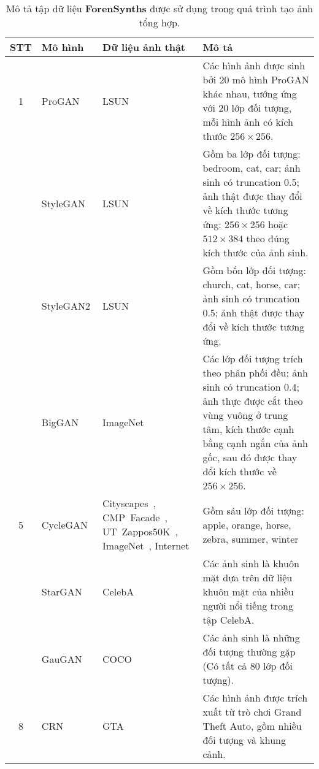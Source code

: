 \begin{table}[ht!]
	\centering
	\caption{Mô tả tập dữ liệu \textbf{ForenSynths} được sử dụng trong quá trình tạo ảnh tổng hợp.}
	\label{tab:forensynths-dataset}
	\begin{adjustbox}{max width=\textwidth}
		\renewcommand{\arraystretch}{1.5}
		\setlength{\tabcolsep}{10pt}
		\begin{tabular}{c p{2cm} p{3cm} p{8.5cm}}
			\toprule
			\textbf{STT} & \textbf{Mô hình} & \textbf{Dữ liệu ảnh thật} & \textbf{Mô tả} \\
			\midrule
			1 & ProGAN~\cite{karras2018progressive} & LSUN~\cite{Yu2015LSUNCO} & Các hình ảnh được sinh bởi 20 mô hình ProGAN khác nhau, tướng ứng với 20 lớp đối tượng, mỗi hình ảnh có kích thước  $256 \times 256$. \\
			\hdashline
			2 & StyleGAN~\cite{karras2019style} & LSUN~\cite{Yu2015LSUNCO} & Gồm ba lớp đối tượng: bedroom, cat, car; ảnh sinh có truncation 0.5; ảnh thật được thay đổi về kích thước tương ứng: $256 \times 256$ hoặc $512 \times 384$ theo đúng kích thước của ảnh sinh. \\
			\hdashline
			3 & StyleGAN2\cite{Karras2019AnalyzingAI} & LSUN~\cite{Yu2015LSUNCO} & Gồm bốn lớp đối tượng: church, cat, horse, car; ảnh sinh có truncation 0.5; ảnh thật được thay đổi về kích thước tương ứng. \\
			\hdashline
			4 & BigGAN~\cite{brock2018large} & ImageNet~\cite{5206848} & Các lớp đối tượng trích theo phân phối đều; ảnh sinh có truncation 0.4; ảnh thực được cắt theo vùng vuông ở trung tâm, kích thước cạnh bằng cạnh ngắn của ảnh gốc, sau đó được thay đổi kích thước về $256 \times 256$. \\
			\midrule
			5 & CycleGAN~\cite{zhu2017unpaired} & Cityscapes~\cite{Cordts2016Cityscapes}, CMP~Facade~\cite{Tylecek13}, UT~Zappos50K~\cite{6909426}, ImageNet~\cite{5206848}, Internet & Gồm sáu lớp đối tượng: apple, orange, horse, zebra, summer, winter\\
			\hdashline
			6 & StarGAN~\cite{choi2018stargan} & CelebA~\cite{liu2015faceattributes} & Các ảnh sinh là khuôn mặt dựa trên dữ liệu khuôn mặt của nhiều người nổi tiếng trong tập CelebA.\\
			\hdashline
			7 & GauGAN~\cite{park2019SPADE} & COCO~\cite{lin2014microsoft} & Các ảnh sinh là những đối tượng thường gặp (Có tất cả 80 lớp đối tượng). \\
			\midrule
			8 & CRN~\cite{chen2017photographic} & GTA~\cite{barua2025gta} & Các hình ảnh được trích xuất từ trò chơi Grand Theft Auto, gồm nhiều đối tượng và khung cảnh. \\

\end{tabular}
\end{adjustbox}
\end{table}
